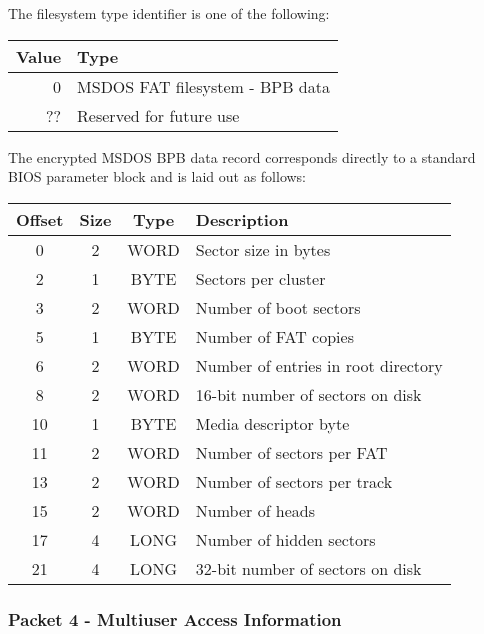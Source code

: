 The filesystem type identifier is one of the following:

\begin{center}
\begin{tabular}{|r|l|}
\hline
    Value &  Type\\
\hline
      0   &  MSDOS FAT filesystem - BPB data\\
     ??   &  Reserved for future use\\
\hline
\end{tabular}
\end{center}

The encrypted MSDOS BPB data record corresponds directly to a standard BIOS
parameter block and is laid out as follows:

\begin{center}
\begin{tabular}{|c|c|c|l|}
\hline
    Offset & Size &   Type   &     Description\\
\hline
       0   &   2  &   WORD   &     Sector size in bytes \\
       2   &   1  &   BYTE   &     Sectors per cluster\\
       3   &   2  &   WORD   &     Number of boot sectors\\
       5   &   1  &   BYTE   &     Number of FAT copies\\
       6   &   2  &   WORD   &     Number of entries in root directory\\
       8   &   2  &   WORD   &     16-bit number of sectors on disk\\
      10   &   1  &   BYTE   &     Media descriptor byte\\
      11   &   2  &   WORD   &     Number of sectors per FAT\\
      13   &   2  &   WORD   &     Number of sectors per track\\
      15   &   2  &   WORD   &     Number of heads\\
      17   &   4  &   LONG   &     Number of hidden sectors\\
      21   &   4  &   LONG   &     32-bit number of sectors on disk\\
\hline
\end{tabular}
\end{center}


\subsubsection{Packet 4 - Multiuser Access Information}

